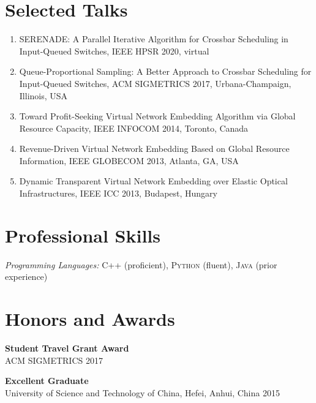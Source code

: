 \documentclass[line,11pt,letter]{includes/cls/myRes}
\begin{document}
\begin{resume}
\section{Selected Talks}
\vspace{-4pt}
\vspace*{2pt}
\begin{enumerate}[
  label=\arabic*. ,
  labelwidth=\widthof{1. },
  leftmargin=\widthof{1.\enspace}
  ] \itemsep -2pt %
    \item  SERENADE: A Parallel Iterative Algorithm for Crossbar Scheduling in Input-Queued Switches, IEEE HPSR 2020, virtual
    \item  Queue-Proportional Sampling: A Better Approach to Crossbar Scheduling for Input-Queued Switches, ACM SIGMETRICS 2017, Urbana-Champaign, Illinois, USA
    \item  Toward Profit-Seeking Virtual Network Embedding Algorithm via Global Resource Capacity, IEEE INFOCOM 2014, Toronto, Canada
    \item  Revenue-Driven Virtual Network Embedding Based on Global Resource Information, IEEE GLOBECOM 2013, Atlanta, GA, USA
    \item  Dynamic Transparent Virtual Network Embedding over Elastic Optical Infrastructures, IEEE ICC 2013, Budapest, Hungary
  \end{enumerate}
\vspace*{2pt}\negspace
\section{Professional Skills}
\vspace{-4pt}
\setlength{\parskip}{0pt}
{\sl Programming Languages:} \textsc{C++} (proficient), \textsc{Python} (fluent), \textsc{Java} (prior experience)\\
\vspace*{4pt}
\negspace
\section{Honors and Awards}
\vspace{-4pt}
{\setlength{\parskip}{0pt}
{\bf Student Travel Grant Award}\\
{\hspace*{1em} ACM SIGMETRICS \hfill 2017\break}
}
\sspace

{\setlength{\parskip}{0pt}
{\bf Excellent Graduate}\\
{\hspace*{1em} University of Science and Technology of China, Hefei, Anhui, China \hfill 2015\break}
}
\sspace


\end{resume}
\end{document}
